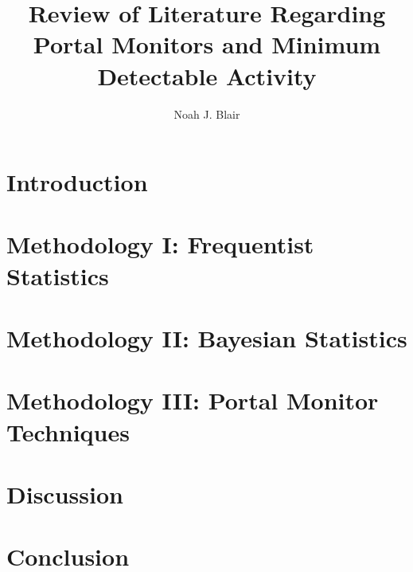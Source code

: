 \documentclass[12 pt]{paper}
\title{Review of Literature Regarding Portal Monitors and Minimum Detectable Activity}
\author{Noah J. Blair}
\begin{document}
\maketitle
\begin{abstract}
  \noindent
  
\end{abstract}
\tableofcontents
\newpage
\section{Introduction}\label{toc:s.introduction}

\section{Methodology I: Frequentist Statistics}\label{toc:s.methodology.Frequentist}

\section{Methodology II: Bayesian Statistics}\label{toc:s.methodology.Bayesian}

\section{Methodology III: Portal Monitor Techniques}\label{toc:s.methodology.PortalMonitors}

\section{Discussion}\label{toc:s.discussion}

\section{Conclusion}\label{toc:s.conclusion}



{}

\csuHonorPledge
\end{document}
